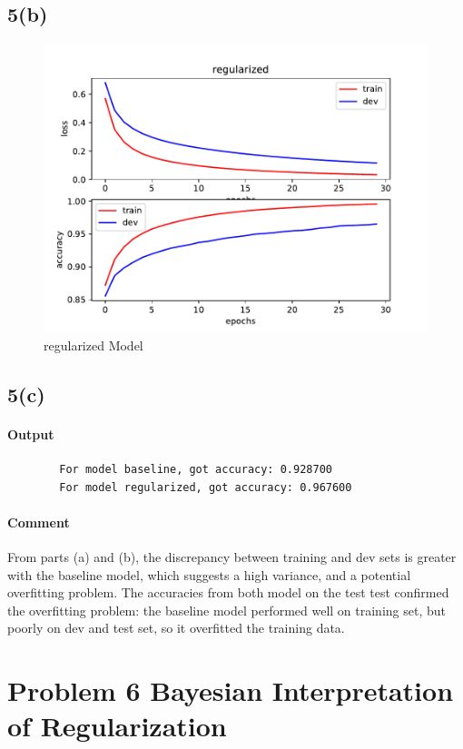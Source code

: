\documentclass[11pt]{article}
\begin{document}
	\subsection{5(b)}
	\begin{figure}[h]
		\centering
		\includegraphics{src/mnist/regularized.pdf}
		\caption{regularized Model}
	\end{figure}
	
	\newpage
	\subsection{5(c)}
	\paragraph{Output} 
	\begin{verbatim}
		For model baseline, got accuracy: 0.928700
		For model regularized, got accuracy: 0.967600
	\end{verbatim}
	\paragraph{Comment} From parts (a) and (b), the discrepancy between training and dev sets is greater with the baseline model, which suggests a high variance, and a potential overfitting problem. The accuracies from both model on the test test confirmed the overfitting problem: the baseline model performed well on training set, but poorly on dev and test set, so it overfitted the training data.
	
	\newpage
	\section{Problem 6 Bayesian Interpretation of Regularization}
\end{document}
